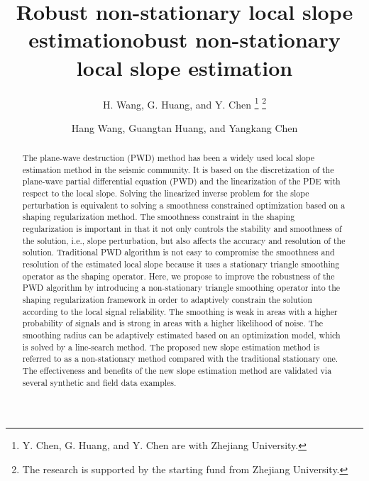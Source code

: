 \title{Robust non-stationary local slope estimation}
\renewcommand{\thefootnote}{\fnsymbol{footnote}}
\author{H. Wang, G. Huang, and Y. Chen
\thanks{Y. Chen, G. Huang, and Y. Chen are with Zhejiang University.}
\thanks{The research is supported by the starting fund from Zhejiang University.}}
\maketitle



\title{obust non-stationary local slope estimation}
\renewcommand{\thefootnote}{\fnsymbol{footnote}}
\author{Hang Wang\footnotemark[1], Guangtan Huang\footnotemark[1], and Yangkang Chen\footnotemark[1]}


\address{
\footnotemark[1]
School of Earth Sciences\\
Zhejiang University\\
Hangzhou, Zhejiang Province, China, 310027\\
chenyk2016@gmail.com \\}



\DeclareRobustCommand{\old}[1]{}
\DeclareRobustCommand{\new}[1]{#1}
\DeclareRobustCommand{\dlo}[1]{}
\DeclareRobustCommand{\wen}[1]{#1}

\begin{abstract}
The plane-wave destruction (PWD) method has been a widely used local slope estimation method in the seismic community. It is based on the discretization of the plane-wave partial differential equation (PWD) and the linearization of the PDE with respect to the local slope. Solving the linearized inverse problem for the slope perturbation is equivalent to solving a smoothness constrained optimization based on a shaping regularization method. The smoothness constraint in the shaping regularization is important in that it not only controls the stability and smoothness of the solution, i.e., slope perturbation, but also affects the accuracy and resolution of the solution. Traditional PWD algorithm is not easy to compromise the smoothness and resolution of the estimated local slope because it uses a stationary triangle smoothing operator as the shaping operator. Here, we propose to improve the robustness of the PWD algorithm by introducing a non-stationary triangle smoothing operator into the shaping regularization framework in order to adaptively constrain the solution according to the local signal reliability. The smoothing is weak in areas with a higher probability of signals and is strong in areas with a higher likelihood of noise. The smoothing radius can be adaptively estimated based on an optimization model, which is solved by a line-search method. The proposed new slope estimation method is referred to as a non-stationary method compared with the traditional stationary one. The effectiveness and benefits of the new slope estimation method are validated via several synthetic and field data examples.
\end{abstract}

